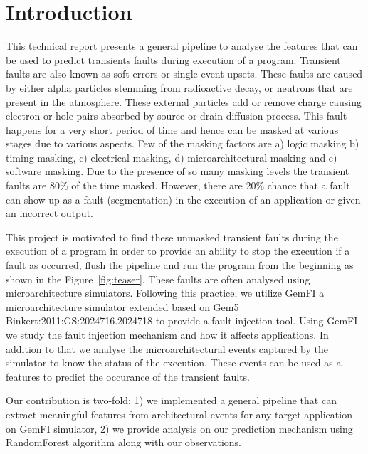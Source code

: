 \section{Introduction}
This technical report presents a general pipeline to analyse the features that can be used to predict transients faults during execution of a program. Transient faults are also known as soft errors or single event upsets. These faults are caused by either alpha particles stemming from radioactive decay, or neutrons that are present in the atmosphere. These external particles add or remove charge causing electron or hole pairs absorbed by source or drain diffusion process. This fault happens for a very short period of time and hence can be masked at various stages due to various aspects. Few of the masking factors are a) logic masking b) timing masking, c) electrical masking, d) microarchitectural masking and e) software masking. Due to the presence of so many masking levels the transient faults are 80\% of the time masked. However, there are 20\% chance that a fault can show up as a fault (segmentation) in the execution of an application or given an incorrect output.

This project is motivated to find these unmasked transient faults during the execution of a program in order to provide an ability to stop the execution if a fault as occurred, flush the pipeline and run the program from the beginning as shown in the Figure~\ref{fig:teaser}. These faults are often analysed using microarchitecture simulators. Following this practice, we utilize GemFI \cite{parasyris2014gemfi} a microarchitecture simulator extended based on Gem5 {Binkert:2011:GS:2024716.2024718} to provide a fault injection tool. Using GemFI we study the fault injection mechanism and how it affects applications. In addition to that we analyse the microarchitectural events captured by the simulator to know the status of the execution. These events can be used as a features to predict the occurance of the transient faults.

Our contribution is two-fold: 1) we implemented a general pipeline that can extract meaningful features from architectural events for any target application on GemFI simulator, 2) we provide analysis on our prediction mechanism using RandomForest algorithm along with our observations.

